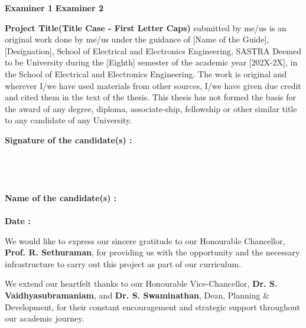 \documentclass[a4paper, 12pt, oneside]{sastra_eee}
\begin{document}
	\vspace*{0.1in}
	\noindent \textbf{Examiner 1} \hfill \textbf{Examiner 2}
	
	
	\declaration
	
	\begin{singlespace}
		
		\textbf{Project Title(Title Case - First Letter Caps)} submitted by me/us is an original work done by me/us under the guidance of [Name of the Guide], [Designation], School of Electrical and Electronics Engineering, SASTRA Deemed to be University during the [Eighth] semester of the academic year [202X-2X], in the School of Electrical and Electronics Engineering. The work is original and wherever I/we have used materials from other sources, I/we have given due credit and cited them in the text of the thesis. This thesis has not formed the basis for the award of any degree, diploma, associate-ship, fellowship or other similar title to any candidate of any University.\\
		
	\end{singlespace}
	\vspace*{0.1in}
	\noindent \textbf{Signature of the candidate(s)	:}	
	\\
	\\
	\\
	\\
	\\
    \noindent\textbf{Name of the candidate(s)	:}
    \\
    \\
	\noindent\textbf{Date\hspace*{43.5mm}					:}
	
	\acknowledgements
\hspace*{12pt}
We would like to express our sincere gratitude to our Honourable Chancellor, \textbf{Prof. R. Sethuraman}, for providing us with the opportunity and the necessary infrastructure to carry out this project as part of our curriculum.

\par We extend our heartfelt thanks to our Honourable Vice-Chancellor, \textbf{Dr. S. Vaidhyasubramaniam}, and \textbf{Dr. S. Swaminathan}, Dean, Planning \& Development, for their constant encouragement and strategic support throughout our academic journey.
\end{document}
